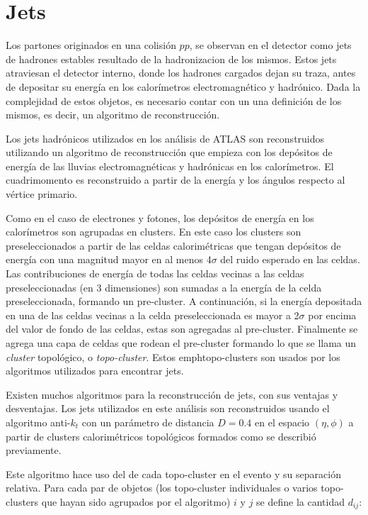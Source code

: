 \section{Jets}
\label{sec:jet_obj}

Los partones originados en una colisión $pp$, se observan en el detector como
jets de hadrones estables resultado de la hadronizacion de los mismos. Estos
jets atraviesan el detector interno, donde los hadrones cargados dejan su traza,
antes de depositar su energía en los calorímetros electromagnético y hadrónico.
Dada la complejidad de estos objetos, es necesario contar con un una definición
de los mismos, es decir, un algoritmo de reconstrucción.

Los jets hadrónicos utilizados en los análisis de ATLAS son reconstruidos utilizando
un algoritmo de reconstrucción que empieza con los depósitos de energía de las lluvias
electromagnéticas y hadrónicas en los calorímetros. El cuadrimomento es reconstruido
a partir de la energía y los ángulos respecto al vértice primario.

Como en el caso de electrones y fotones, los depósitos de energía en los
calorímetros son agrupadas en clusters. En este caso los clusters son
preseleccionados a partir de las celdas calorimétricas que tengan depósitos de
energía con una magnitud mayor en al menos 4$\sigma$ del ruido esperado en las
celdas. Las contribuciones de energía de todas las celdas vecinas a las celdas
preseleccionadas (en 3 dimensiones) son sumadas a la energía de la celda
preseleccionada, formando un pre-cluster. A continuación, si la energía
depositada en una de las celdas vecinas a la celda preseleccionada es mayor a
2$\sigma$ por encima del valor de fondo de las celdas, estas son agregadas al
pre-cluster. Finalmente se agrega una capa de celdas que rodean el pre-cluster
formando lo que se llama un \emph{cluster} topológico, o \emph{topo-cluster}.
Estos emph{topo-clusters} son usados por los algoritmos
utilizados para encontrar jets.

Existen muchos algoritmos para la reconstrucción de jets, con sus ventajas y
desventajas. Los jets utilizados en este análisis son reconstruidos usando el
algoritmo anti-$k_t$\cite{Cacciari:2008gp} con un parámetro de distancia $D =
0.4$ en el espacio $(\eta, \phi)$ a partir de clusters calorimétricos
topológicos\cite{Lampl:1099735} formados como se describió previamente.

Este algoritmo hace uso del {\pt} de cada topo-cluster en el evento y su
separación relativa. Para cada par de objetos (los topo-cluster individuales o
varios topo-clusters que hayan sido agrupados por el algoritmo) $i$ y $j$ se
define la cantidad $d_{ij}$:

